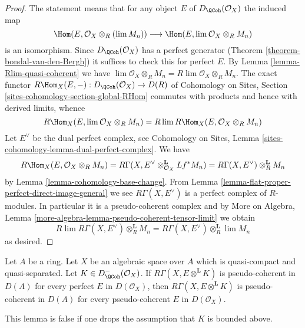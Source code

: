 \begin{proof}
The statement means that for any object $E$ of
$D_\QCoh(\mathcal{O}_X)$ the induced map
$$
\Hom(E, \mathcal{O}_X \otimes_R (\lim M_n))
\longrightarrow
\Hom(E, \lim \mathcal{O}_X \otimes_R M_n)
$$
is an isomorphism. Since $D_\QCoh(\mathcal{O}_X)$ has
a perfect generator (Theorem \ref{theorem-bondal-van-den-Bergh})
it suffices to check this for perfect $E$.
By Lemma \ref{lemma-Rlim-quasi-coherent} we have
$\lim \mathcal{O}_X \otimes_R M_n = R\lim \mathcal{O}_X \otimes_R M_n$.
The exact functor
$R\Hom_X(E, -) : D_\QCoh(\mathcal{O}_X) \to D(R)$
of Cohomology on Sites, Section \ref{sites-cohomology-section-global-RHom}
commutes with products and hence with derived limits, whence
$$
R\Hom_X(E, \lim \mathcal{O}_X \otimes_R M_n) =
R\lim R\Hom_X(E, \mathcal{O}_X \otimes_R M_n)
$$
Let $E^\vee$ be the dual perfect complex, see
Cohomology on Sites, Lemma \ref{sites-cohomology-lemma-dual-perfect-complex}.
We have
$$
R\Hom_X(E, \mathcal{O}_X \otimes_R M_n) =
R\Gamma(X, E^\vee \otimes_{\mathcal{O}_X}^\mathbf{L} Lf^*M_n) =
R\Gamma(X, E^\vee) \otimes_R^\mathbf{L} M_n
$$
by Lemma \ref{lemma-cohomology-base-change}.
From Lemma \ref{lemma-flat-proper-perfect-direct-image-general}
we see $R\Gamma(X, E^\vee)$ is a perfect complex of $R$-modules.
In particular it is a pseudo-coherent complex and by
More on Algebra, Lemma \ref{more-algebra-lemma-pseudo-coherent-tensor-limit}
we obtain
$$
R\lim R\Gamma(X, E^\vee) \otimes_R^\mathbf{L} M_n =
R\Gamma(X, E^\vee) \otimes_R^\mathbf{L} \lim M_n
$$
as desired.
\end{proof}

\begin{lemma}
\label{lemma-perfect-enough}
Let $A$ be a ring. Let $X$ be an algebraic space over $A$ which is
quasi-compact and quasi-separated. Let $K \in D^-_\QCoh(\mathcal{O}_X)$.
If $R\Gamma(X, E \otimes^\mathbf{L} K)$ is pseudo-coherent
in $D(A)$ for every perfect $E$ in $D(\mathcal{O}_X)$,
then $R\Gamma(X, E \otimes^\mathbf{L} K)$ is pseudo-coherent
in $D(A)$ for every pseudo-coherent $E$ in $D(\mathcal{O}_X)$.
\end{lemma}

\noindent
This lemma is false if one drops the assumption that $K$
is bounded above.

